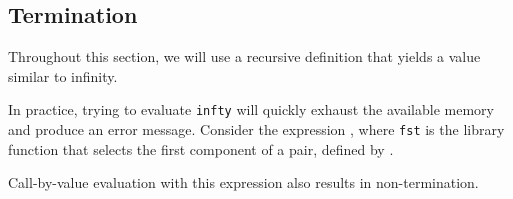 \subsection{Termination}\label{subsec:Termination}
Throughout this section, we will use a recursive definition that yields a value similar to infinity.

In practice, trying to evaluate \texttt{infty} will quickly exhaust the available memory and produce an error message.
Consider the expression , where \texttt{fst} is the library function that selects the first component of a pair, defined by .

Call-by-value evaluation with this expression also results in non-termination.

